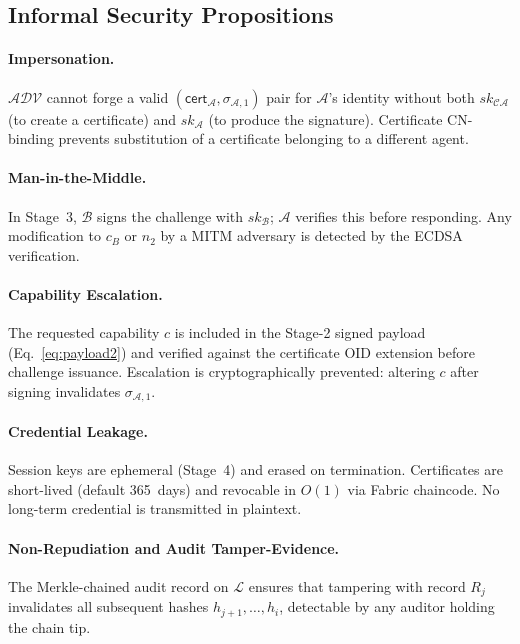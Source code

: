 \documentclass[review,5p,twocolumn,times]{elsarticle}
\begin{document}
\subsection{Informal Security Propositions}

\paragraph{Impersonation.}
$\mathcal{ADV}$ cannot forge a valid
$(\mathsf{cert}_\mathcal{A}, \sigma_{\mathcal{A},1})$ pair for
$\mathcal{A}$'s identity without both $sk_{\mathcal{CA}}$ (to create a
certificate) and $sk_\mathcal{A}$ (to produce the signature).
Certificate CN-binding prevents substitution of a certificate belonging
to a different agent.

\paragraph{Man-in-the-Middle.}
In Stage~3, $\mathcal{B}$ signs the challenge with $sk_\mathcal{B}$;
$\mathcal{A}$ verifies this before responding. Any modification to $c_B$
or $n_2$ by a MITM adversary is detected by the ECDSA verification.

\paragraph{Capability Escalation.}
The requested capability $c$ is included in the Stage-2 signed payload
(Eq.~\ref{eq:payload2}) and verified against the certificate OID extension
before challenge issuance. Escalation is cryptographically prevented:
altering $c$ after signing invalidates $\sigma_{\mathcal{A},1}$.

\paragraph{Credential Leakage.}
Session keys are ephemeral (Stage~4) and erased on termination.
Certificates are short-lived (default 365~days) and revocable in $O(1)$
via Fabric chaincode. No long-term credential is transmitted in plaintext.

\paragraph{Non-Repudiation and Audit Tamper-Evidence.}
The Merkle-chained audit record on $\mathcal{L}$ ensures that tampering
with record $R_j$ invalidates all subsequent hashes $h_{j+1},\ldots,h_i$,
detectable by any auditor holding the chain tip.
\end{document}

